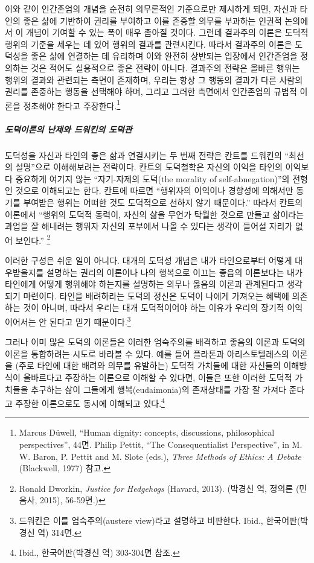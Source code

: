 이와 같이 인간존엄의 개념을 순전히 의무론적인 기준으로만 제시하게 되면, 자신과 타인의 좋은 삶에 기반하여 권리를 부여하고 이를 존중할 의무를 부과하는 인권적 논의에서 이 개념이 기여할 수 있는 폭이 매우 좁아질 것이다. 그런데 결과주의 이론은 도덕적 행위의 기준을 세우는 데 있어 행위의 결과를 관련시킨다. 따라서 결과주의 이론은 도덕성을 좋은 삶에 연결하는 데 유리하며 이와 완전히 상반되는 입장에서 인간존엄을 정의하는 것은 적어도 실용적으로 좋은 전략이 아니다. 결과주의 전략은 올바른 행위는 행위의 결과와 관련되는 측면이 존재하며, 우리는 항상 그 행동의 결과가 다른 사람의 권리를 존중하는 행동을 선택해야 하며, 그리고 그러한 측면에서 인간존엄의 규범적 이론을 정초해야 한다고 주장한다.\footnote{Marcus Düwell, ``Human dignity: concepts, discussions, philosophical perspectives'', 44면. Philip Pettit, ``The Consequentialist Perspective'', in M. W. Baron, P. Pettit and M. Slote (eds.), \emph{Three Methods of Ethics: A Debate} (Blackwell, 1977) 참고.}

\subparagraph{도덕이론의 난제와 드워킨의 도덕관}

도덕성을 자신과 타인의 좋은 삶과 연결시키는 두 번째 전략은 칸트를 드워킨의 ``최선의 설명''으로 이해해보려는 전략이다. 칸트의 도덕철학은 자신의 이익을 타인의 이익보다 중요하게 여기지 않는 ``자기-자제의 도덕(the morality of self-abnegation)''의 전형인 것으로 이해되고는 한다. 칸트에 따르면 ``행위자의 이익이나 경향성에 의해서만 동기를 부여받은 행위는 어떠한 것도 도덕적으로 선하지 않기 때문이다.'' 따라서 칸트의 이론에서 ``행위의 도덕적 동력이, 자신의 삶을 무언가 탁월한 것으로 만들고 삶이라는 과업을 잘 해내려는 행위자 자신의 포부에서 나올 수 있다는 생각이 들어설 자리가 없어 보인다.'' \footnote{Ronald Dworkin, \emph{Justice for Hedgehogs} (Havard, 2013). (박경신 역, 정의론 (민음사, 2015), 56-59면.)}

이러한 구성은 쉬운 일이 아니다. 대개의 도덕성 개념은 내가 타인으로부터 어떻게 대우받을지를 설명하는 권리의 이론이나 나의 행복으로 이끄는 좋음의 이론보다는 내가 타인에게 어떻게 행위해야 하는지를 설명하는 의무나 옳음의 이론과 관계된다고 생각되기 마련이다. 타인을 배려하라는 도덕의 정신은 도덕이 나에게 가져오는 혜택에 의존하는 것이 아니며, 따라서 우리는 대개 도덕적이어야 하는 이유가 우리의 장기적 이익이어서는 안 된다고 믿기 때문이다.\footnote{드워킨은 이를 엄숙주의(austere view)라고 설명하고 비판한다. Ibid., 한국어판(박경신 역) 314면.}

그러나 이미 많은 도덕의 이론들은 이러한 엄숙주의를 배격하고 좋음의 이론과 도덕의 이론을 통합하려는 시도로 바라볼 수 있다. 예를 들어 플라톤과 아리스토텔레스의 이론을 (주로 타인에 대한 배려와 의무를 유발하는) 도덕적 가치들에 대한 자신들의 이해방식이 올바르다고 주장하는 이론으로 이해할 수 있다면, 이들은 또한 이러한 도덕적 가치들을 추구하는 삶이 그들에게 행복(eudaimonia)의 존재상태를 가장 잘 가져다 준다고 주장한 이론으로도 동시에 이해되고 있다.\footnote{Ibid., 한국어판(박경신 역) 303-304면 참조.}

